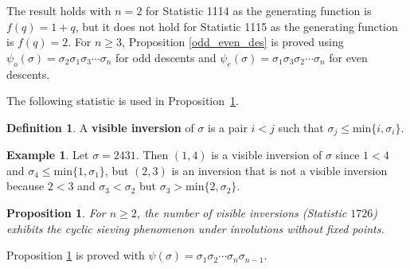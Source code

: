 \documentclass{amsart}
\newtheorem{prop}[thm]{Proposition}
\theoremstyle{definition}
\newtheorem{definition}[thm]{Definition}
\newtheorem{example}[thm]{Example}
\begin{document}
The result holds with $n = 2$ for Statistic 1114 as the generating function is $f(q) = 1 + q$, but it does not hold for Statistic 1115 as the generating function is $f(q) = 2$. For $n \geq 3$, Proposition \ref{odd_even_des} is proved using $\psi_o(\sigma) = \sigma_2\sigma_1\sigma_3 \dotsm \sigma_n$ for odd descents and $\psi_e(\sigma) = \sigma_1\sigma_3\sigma_2 \dotsm \sigma_n$ for even descents. 
\smallskip

The following statistic is used in Proposition~\ref{vis_inv}. 
\begin{definition}
  A \textbf{visible inversion} of $\sigma$ is a pair $i < j$ such that $\sigma_j \leq \textrm{min} \{i, \sigma_i\}$.
\end{definition}

\begin{example}
  Let $\sigma = 2431$. Then $(1, 4)$ is a visible inversion of $\sigma$ since $1 < 4$ and $\sigma_4 \leq \textrm{min} \{1, \sigma_1\}$, but $(2, 3)$ is an inversion that is not a visible inversion because $2 < 3$ and $\sigma_3 < \sigma_2$ but $\sigma_3 > \textrm{min} \{2, \sigma_2\}$.
\end{example}



\begin{prop}\label{vis_inv}
  For $n \geq 2$, the number of visible inversions (Statistic $1726$) exhibits the cyclic sieving phenomenon under involutions without fixed points.
\end{prop}

Proposition \ref{vis_inv} is proved with $\psi(\sigma) = \sigma_1\sigma_2 \dotsm \sigma_n\sigma_{n-1}$.
\smallskip
\end{document}
